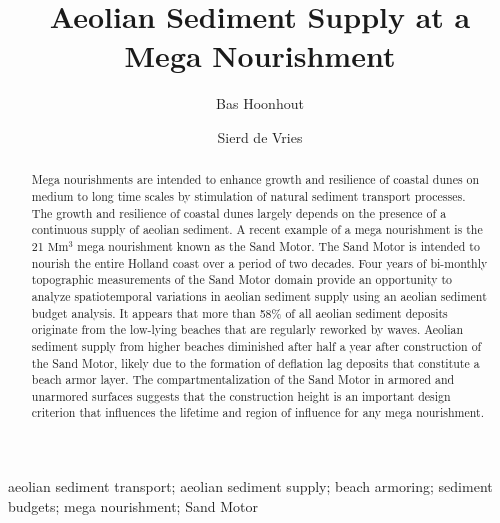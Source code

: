 \documentclass[preprint,12pt,authoryear]{elsarticle}
\begin{document}
\begin{frontmatter}

  \title{Aeolian Sediment Supply at a Mega Nourishment}

  \author[tudelft,deltares]{Bas Hoonhout}

  \author[tudelft]{Sierd de Vries}

  \address[tudelft]{Delft University of Technology, Faculty of Civil
    Engineering and Geosciences, Department of Hydraulic Engineering,
    Stevinweg 1, 2628CN Delft, The Netherlands.}

  \address[deltares]{Deltares, Department of Hydraulic Engineering,
    Boussinesqweg 1, 2629HV Delft, The Netherlands.}

  \begin{abstract}
    Mega nourishments are intended to enhance growth and resilience of
    coastal dunes on medium to long time scales by stimulation of
    natural sediment transport processes. The growth and resilience of
    coastal dunes largely depends on the presence of a continuous
    supply of aeolian sediment. A recent example of a mega nourishment
    is the 21 $\mathrm{Mm^3}$ mega nourishment known as the Sand
    Motor. The Sand Motor is intended to nourish the entire Holland
    coast over a period of two decades. Four years of bi-monthly
    topographic measurements of the Sand Motor domain provide an
    opportunity to analyze spatiotemporal variations in aeolian
    sediment supply using an aeolian sediment budget analysis. It
    appears that more than 58\% of all aeolian sediment deposits
    originate from the low-lying beaches that are regularly reworked
    by waves. Aeolian sediment supply from higher beaches diminished
    after half a year after construction of the Sand Motor, likely due
    to the formation of deflation lag deposits that constitute a beach
    armor layer. The compartmentalization of the Sand Motor in armored
    and unarmored surfaces suggests that the construction height is an
    important design criterion that influences the lifetime and region
    of influence for any mega nourishment.
  \end{abstract}

  \begin{keyword}
    aeolian sediment transport; aeolian sediment supply; beach
    armoring; sediment budgets; mega nourishment; Sand Motor
  \end{keyword}

\end{frontmatter}
\end{document}
